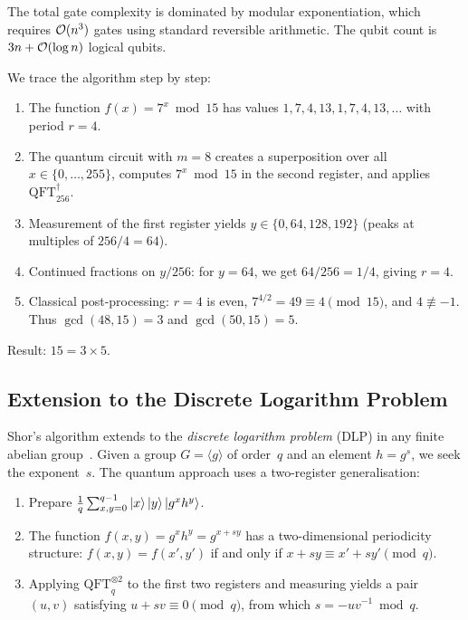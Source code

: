 The total gate complexity is dominated by modular exponentiation, which requires $\mathcal{O}(n^3)$ gates using standard reversible arithmetic.  The qubit count is $3n + \mathcal{O}(\log n)$ logical qubits.

\begin{example}[Factoring $N = 15$ with $a = 7$]
\label{ex:factor-15}
We trace the algorithm step by step:
\begin{enumerate}
\item The function $f(x) = 7^x \bmod 15$ has values $1, 7, 4, 13, 1, 7, 4, 13, \ldots$ with period $r = 4$.
\item The quantum circuit with $m = 8$ creates a superposition over all $x \in \{0,\ldots,255\}$, computes $7^x \bmod 15$ in the second register, and applies $\text{QFT}_{256}^{\dagger}$.
\item Measurement of the first register yields $y \in \{0, 64, 128, 192\}$ (peaks at multiples of $256/4 = 64$).
\item Continued fractions on $y/256$: for $y = 64$, we get $64/256 = 1/4$, giving $r = 4$.
\item Classical post-processing: $r = 4$ is even, $7^{4/2} = 49 \equiv 4 \pmod{15}$, and $4 \not\equiv -1$.  Thus $\gcd(48, 15) = 3$ and $\gcd(50, 15) = 5$.
\end{enumerate}
Result: $15 = 3 \times 5$.
\end{example}


\subsection{Extension to the Discrete Logarithm Problem}
\label{subsec:shor-dlp}

Shor's algorithm extends to the \emph{discrete logarithm problem} (DLP) in any finite abelian group~\cite{Shor1997}.  Given a group $G = \langle g \rangle$ of order~$q$ and an element $h = g^s$, we seek the exponent~$s$.  The quantum approach uses a two-register generalisation:

\begin{enumerate}
\item Prepare $\frac{1}{q}\sum_{x,y=0}^{q-1}\ket{x}\ket{y}\ket{g^x h^y}$.
\item The function $f(x,y) = g^x h^y = g^{x+sy}$ has a two-dimensional periodicity structure: $f(x,y) = f(x',y')$ if and only if $x + sy \equiv x' + sy' \pmod{q}$.
\item Applying $\text{QFT}_q^{\otimes 2}$ to the first two registers and measuring yields a pair $(u,v)$ satisfying $u + sv \equiv 0 \pmod{q}$, from which $s = -uv^{-1} \bmod q$.
\end{enumerate}

